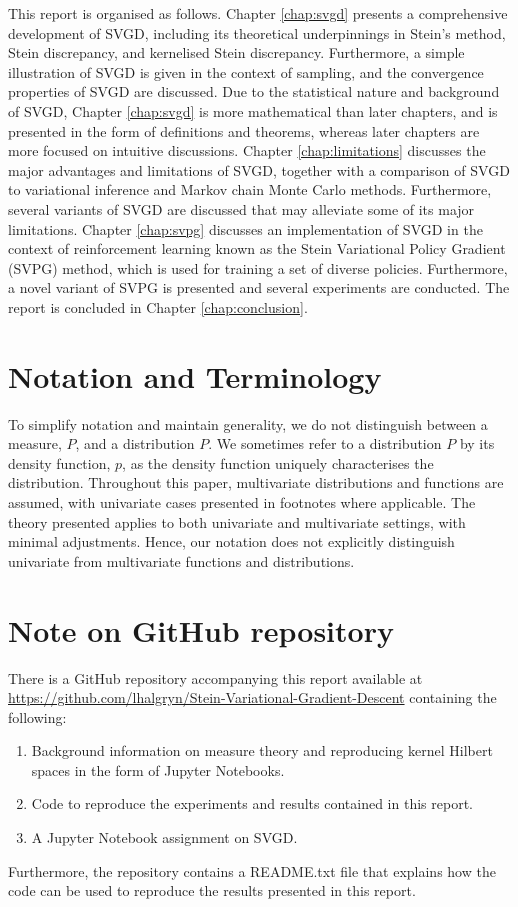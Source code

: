 This report is organised as follows. Chapter \ref{chap:svgd} presents a comprehensive development of SVGD, including its theoretical underpinnings in Stein's method, Stein discrepancy, and kernelised Stein discrepancy. Furthermore, a simple illustration of SVGD is given in the context of sampling, and the convergence properties of SVGD are discussed. Due to the statistical nature and background of SVGD, Chapter \ref{chap:svgd} is more mathematical than later chapters, and is presented in the form of definitions and theorems, whereas later chapters are more focused on intuitive discussions. Chapter \ref{chap:limitations} discusses the major advantages and limitations of SVGD, together with a comparison of SVGD to variational inference and Markov chain Monte Carlo methods. Furthermore, several variants of SVGD are discussed that may alleviate some of its major limitations. Chapter \ref{chap:svpg} discusses an implementation of SVGD in the context of reinforcement learning known as the Stein Variational Policy Gradient \citep{liu_svpg} (SVPG) method, which is used for training a set of diverse policies. Furthermore, a novel variant of SVPG is presented and several experiments are conducted. The report is concluded in Chapter \ref{chap:conclusion}.

\section{Notation and Terminology}

To simplify notation and maintain generality, we do not distinguish between a measure, $P$, and a distribution $P$. We sometimes refer to a distribution $P$ by its density function, $p$, as the density function uniquely characterises the distribution. Throughout this paper, multivariate distributions and functions are assumed, with univariate cases presented in footnotes where applicable. The theory presented applies to both univariate and multivariate settings, with minimal adjustments. Hence, our notation does not explicitly distinguish univariate from multivariate functions and distributions.


\section{Note on GitHub repository}

There is a GitHub repository accompanying this report available at \url{https://github.com/lhalgryn/Stein-Variational-Gradient-Descent} containing the following:
\begin{enumerate}
	\item Background information on measure theory and reproducing kernel Hilbert spaces in the form of Jupyter Notebooks.
	\item Code to reproduce the experiments and results contained in this report.
	\item A Jupyter Notebook assignment on SVGD.
\end{enumerate}

Furthermore, the repository contains a README.txt file that explains how the code can be used to reproduce the results presented in this report.

















